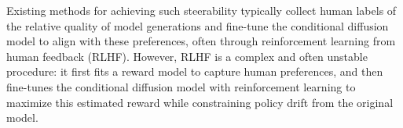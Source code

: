 

Existing methods for achieving such steerability typically collect human labels of the relative quality of model generations and fine-tune the conditional diffusion model to align with these preferences, often through reinforcement learning from human feedback (RLHF). However, RLHF is a complex and often unstable procedure: it first fits a reward model to capture human preferences, and then fine-tunes the conditional diffusion model with reinforcement learning to maximize this estimated reward while constraining policy drift from the original model.

